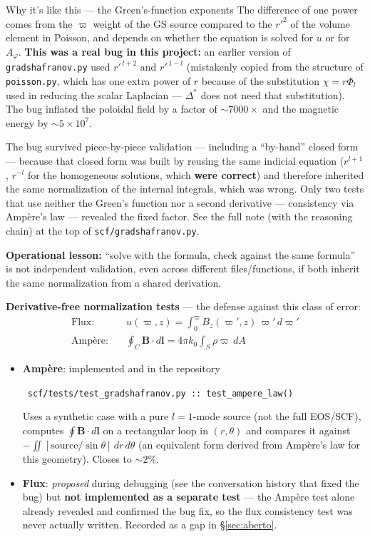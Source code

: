 \documentclass[11pt,a4paper]{scrartcl}
\newcommand{\arrowto}[1]{%
  \par\vspace{2pt}\noindent{\color{linkblue}$\rightarrow$}~\texttt{\small #1}\par\vspace{2pt}}
\newcommand{\code}[1]{\texttt{\small #1}}
\begin{document}
\begin{whybox}{Why it's like this --- the Green's-function exponents}
The difference of one power comes from the $\varpi$ weight of the GS
source compared to the $r'^2$ of the volume element in Poisson, and
depends on whether the equation is solved for $u$ or for $A_\varphi$.
\textbf{This was a real bug in this project:} an earlier version of
\code{gradshafranov.py} used $r'^{\,l+2}$ and $r'^{\,1-l}$ (mistakenly
copied from the structure of \code{poisson.py}, which has one extra
power of $r$ because of the substitution $\chi=r\Phi_l$ used in reducing
the scalar Laplacian --- $\Delta^*$ does not need that substitution). The
bug inflated the poloidal field by a factor of $\sim7000\times$ and the
magnetic energy by $\sim5\times10^7$.

The bug survived piece-by-piece validation --- including a ``by-hand''
closed form --- because that closed form was built by reusing the same
indicial equation ($r^{l+1}$, $r^{-l}$ for the homogeneous solutions,
which \textbf{were correct}) and therefore inherited the same
normalization of the internal integrals, which was wrong. Only two tests
that use neither the Green's function nor a second derivative ---
consistency via Ampère's law --- revealed the fixed factor. See the full
note (with the reasoning chain) at the top of \code{scf/gradshafranov.py}.

\smallskip
\textbf{Operational lesson:} ``solve with the formula, check against the
same formula'' is not independent validation, even across different
files/functions, if both inherit the same normalization from a shared
derivation.
\end{whybox}

\textbf{Derivative-free normalization tests} --- the defense against this
class of error:
\begin{align}
\text{Flux:}\quad & u(\varpi,z) = \int_0^\varpi B_z(\varpi',z)\,\varpi'\,d\varpi'\\
\text{Ampère:}\quad & \oint_C \mathbf{B}\cdot d\mathbf{l} = 4\pi k_0\int_S \rho\varpi\,dA
\end{align}

\begin{itemize}[leftmargin=1.4em]
\item \textbf{Ampère}: implemented and in the repository
  \arrowto{scf/tests/test\_gradshafranov.py :: test\_ampere\_law()}
  Uses a synthetic case with a pure $l=1$-mode source (not the full
  EOS/SCF), computes $\oint\mathbf{B}\cdot d\mathbf{l}$ on a rectangular
  loop in $(r,\theta)$ and compares it against
  $-\iint[\mathrm{source}/\sin\theta]\,dr\,d\theta$ (an equivalent form
  derived from Ampère's law for this geometry). Closes to $\sim2\%$.
\item \textbf{Flux}: \emph{proposed} during debugging (see the
  conversation history that fixed the bug) but \textbf{not implemented as
  a separate test} --- the Ampère test alone already revealed and
  confirmed the bug fix, so the flux consistency test was never actually
  written. Recorded as a gap in \S\ref{sec:aberto}.
\end{itemize}
\end{document}
